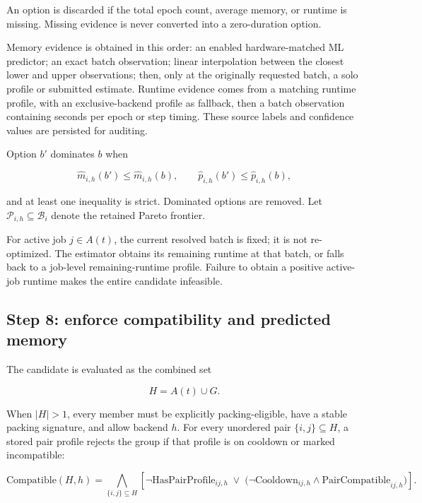 \documentclass[11pt]{article}
\begin{document}
An option is discarded if the total epoch count, average memory, or runtime is
missing.  Missing evidence is never converted into a zero-duration option.

Memory evidence is obtained in this order: an enabled hardware-matched ML
predictor; an exact batch observation; linear interpolation between the closest
lower and upper observations; then, only at the originally requested batch, a
solo profile or submitted estimate.  Runtime evidence comes from a matching
runtime profile, with an exclusive-backend profile as fallback, then a batch
observation containing seconds per epoch or step timing.  These source labels
and confidence values are persisted for auditing.

Option $b'$ dominates $b$ when

\begin{equation}
  \widehat m_{i,h}(b')\le\widehat m_{i,h}(b),\qquad
  \widehat p_{i,h}(b')\le\widehat p_{i,h}(b),
  \label{eq:dominance-weak}
\end{equation}

and at least one inequality is strict.  Dominated options are removed.  Let
$\mathcal P_{i,h}\subseteq\mathcal B_i$ denote the retained Pareto frontier.

For active job $j\in A(t)$, the current resolved batch is fixed; it is not
re-optimized.  The estimator obtains its remaining runtime at that batch, or
falls back to a job-level remaining-runtime profile.  Failure to obtain a
positive active-job runtime makes the entire candidate infeasible.

\subsection{Step 8: enforce compatibility and predicted memory}

The candidate is evaluated as the combined set

\begin{equation}
  H=A(t)\cup G.
\end{equation}

When $|H|>1$, every member must be explicitly packing-eligible, have a stable
packing signature, and allow backend $h$.  For every unordered pair
$\{i,j\}\subseteq H$, a stored pair profile rejects the group if that profile is
on cooldown or marked incompatible:

\begin{equation}
  \mathrm{Compatible}(H,h)
  =\bigwedge_{\{i,j\}\subseteq H}
   \left[
     \neg\mathrm{HasPairProfile}_{ij,h}
     \;\lor\;
     \bigl(\neg\mathrm{Cooldown}_{ij,h}\land
            \mathrm{PairCompatible}_{ij,h}\bigr)
   \right].
  \label{eq:pair-compatibility}
\end{equation}
\end{document}
